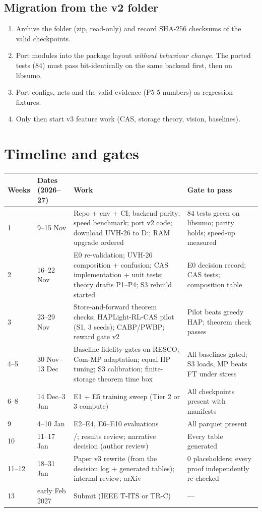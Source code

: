 \documentclass[11pt,a4paper]{article}
\newcommand{\file}[1]{\texttt{\detokenize{#1}}}
\begin{document}
\subsection{Migration from the v2 folder}
\begin{enumerate}
\item Archive the folder (zip, read-only) and record SHA-256 checksums of the valid
      checkpoints.
\item Port modules into the package layout \emph{without behaviour change}. The ported
      tests (84) must pass bit-identically on the same backend first, then on libsumo.
\item Port configs, nets and the valid evidence (P5-5 numbers) as regression fixtures.
\item Only then start v3 feature work (CAS, storage theory, vision, baselines).
\end{enumerate}

\section{Timeline and gates}
\small
\begin{longtable}{@{}p{1.6cm}p{2.9cm}p{7.2cm}p{4.0cm}@{}}
\toprule
Weeks & Dates (2026--27) & Work & Gate to pass \\
\midrule
\endhead
1 & 9--15 Nov & Repo + env + CI; backend parity; speed benchmark; port v2 code;
  download UVH-26 to D:; RAM upgrade ordered & 84 tests green on libsumo; parity holds;
  speed-up measured \\
2 & 16--22 Nov & E0 re-validation; UVH-26 composition + confusion; CAS implementation +
  unit tests; theory drafts P1--P4; S3 rebuild started & E0 decision record; CAS tests;
  composition table \\
3 & 23--29 Nov & Store-and-forward theorem checks; HAPLight-RL-CAS pilot (S1, 3 seeds);
  CABP/PWBP; reward gate v2 & Pilot beats greedy HAP; theorem check passes \\
4--5 & 30 Nov--13 Dec & Baseline fidelity gates on RESCO; Com-MP adaptation; equal HP tuning;
  S3 calibration; finite-storage theorem time box & All baselines gated; S3 loads, MP beats
  FT under stress \\
6--8 & 14 Dec--3 Jan & E1 + E5 training sweep (Tier 2 or 3 compute) & All checkpoints
  present with manifests \\
9 & 4--10 Jan & E2--E4, E6--E10 evaluations & All parquet present \\
10 & 11--17 Jan & \file{stats.py}/\file{report.py}; results review; narrative decision
  (author review) & Every table generated \\
11--12 & 18--31 Jan & Paper v3 rewrite (from the decision log + generated tables);
  internal review; arXiv & 0 placeholders; every proof independently re-checked \\
13 & early Feb 2027 & Submit (IEEE T-ITS or TR-C) & --- \\
\bottomrule
\end{longtable}
\normalsize
\end{document}
